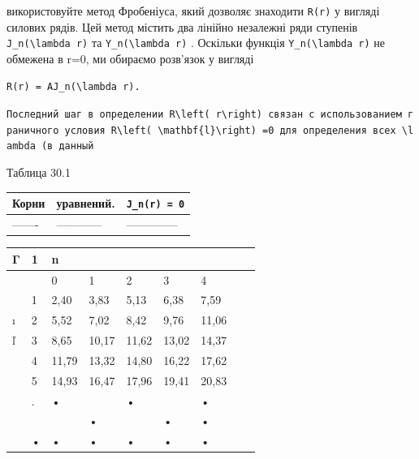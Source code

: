 \documentclass[
  ukrainian,
]{article}
\newcounter{none} %
\begin{document}
використовуйте метод Фробеніуса, який дозволяє знаходити \texttt{R(r)} у
вигляді силових рядів. Цей метод містить два лінійно незалежні ряди
ступенів \texttt{J\_n(\textbackslash{}lambda\ r)} та
\texttt{Y\_n(\textbackslash{}lambda\ r)} . Оскільки функція
\texttt{Y\_n(\textbackslash{}lambda\ r)} не обмежена в r=0, ми обираємо
розв'язок у вигляді

\begin{verbatim}
R(r) = AJ_n(\lambda r).
\end{verbatim}

\texttt{Последний\ шаг\ в\ определении\ \textquotesingle{}R\textbackslash{}left(\ r\textbackslash{}right)\textquotesingle{}\ связан\ с\ использованием\ граничного\ условия\ \textquotesingle{}R\textbackslash{}left(\ \textbackslash{}mathbf\{l\}\textbackslash{}right)\ =0\textquotesingle{}\ для\ определения\ всех\ \textquotesingle{}\textbackslash{}lambda\textquotesingle{}\ (в\ данный}

Таблица 30.1

{\def\LTcaptype{none} %
\begin{longtable}[]{@{}lll@{}}
\toprule\noalign{}
Корни & уравнений. & \texttt{J\_n(r)\ =\ 0} \\
\midrule\noalign{}
\endhead
\bottomrule\noalign{}
\endlastfoot
------- & ------------ & -------------- \\
\end{longtable}
}

{\def\LTcaptype{none} %
\begin{longtable}[]{@{}lllllllll@{}}
\toprule\noalign{}
Γ & 1 & n & & & & & & \\
\midrule\noalign{}
\endhead
\bottomrule\noalign{}
\endlastfoot
& & 0 & 1 & 2 & 3 & 4 & & \\
& 1 & 2,40 & 3,83 & 5,13 & 6,38 & 7,59 & & \\
ı & 2 & 5,52 & 7,02 & 8,42 & 9,76 & 11,06 & & \\
ľ & 3 & 8,65 & 10,17 & 11,62 & 13,02 & 14,37 & & \\
& 4 & 11,79 & 13,32 & 14,80 & 16,22 & 17,62 & & \\
& 5 & 14,93 & 16,47 & 17,96 & 19,41 & 20,83 & & \\
& . & • & & • & & • & & \\
& & & • & & • & • & & \\
& • & • & • & • & • & • & & \\
\end{longtable}
}
\end{document}
